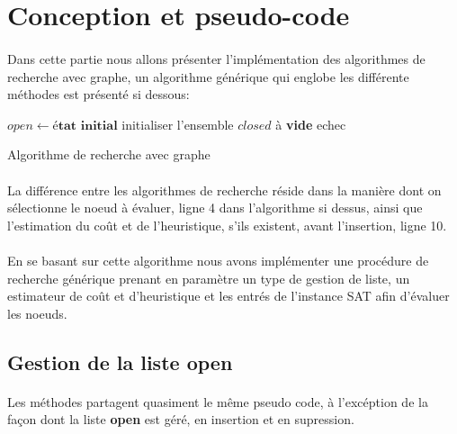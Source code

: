 \section{Conception et pseudo-code}
\paragraph{}
Dans cette partie nous allons présenter l’implémentation des algorithmes de recherche avec graphe, un algorithme générique qui englobe les différente méthodes est présenté si dessous:

\begin{algorithm}
	\SetAlgoLined
	$open \gets \textbf{état initial}$\;
	initialiser l'ensemble $closed$ à \textbf{vide}\;
	\Return echec\;
\caption{Algorithme de recherche avec graphe}
\end{algorithm}
\paragraph{}
La différence entre les algorithmes de recherche réside dans la manière dont on sélectionne le noeud à évaluer, ligne 4 dans l’algorithme si dessus, ainsi que l’estimation du coût et de l’heuristique, s’ils existent, avant l’insertion, ligne 10.\\
\paragraph{}
En se basant sur cette algorithme nous avons implémenter une procédure de recherche générique prenant en paramètre un type de gestion de liste, un estimateur de coût et d’heuristique et les entrés de l’instance SAT afin d’évaluer les noeuds.
\subsection{Gestion de la liste open}
\paragraph{}
Les méthodes partagent quasiment le même pseudo code, à l'excéption de la façon dont la liste \textbf{open} est géré, en insertion et en supression.
